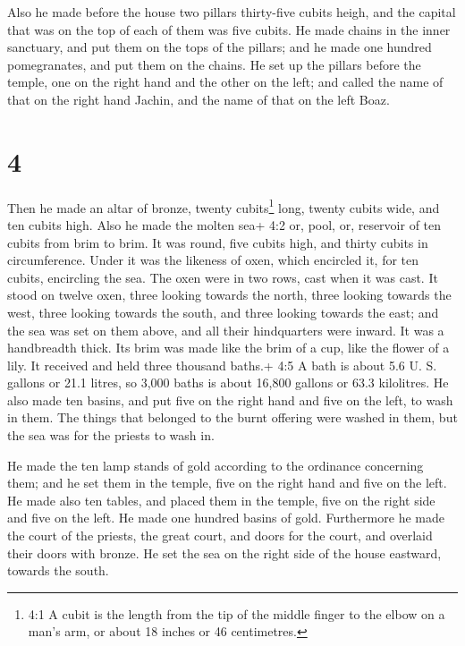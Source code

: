  Also he made before the house two pillars thirty-five
cubits heigh, and the capital that was on the top of each of them was
five cubits.  He made chains in the inner sanctuary, and
put them on the tops of the pillars; and he made one hundred
pomegranates, and put them on the chains.  He set up the
pillars before the temple, one on the right hand and the other on the
left; and called the name of that on the right hand Jachin, and the name
of that on the left Boaz.

\hypertarget{section-3}{%
\section{4}\label{section-3}}

 Then he made an altar of bronze, twenty cubits\footnote{4:1
  A cubit is the length from the tip of the middle finger to the elbow
  on a man's arm, or about 18 inches or 46 centimetres.} long, twenty
cubits wide, and ten cubits high.  Also he made the molten
sea+ 4:2 or, pool, or, reservoir of ten cubits from brim to brim. It was
round, five cubits high, and thirty cubits in circumference.
 Under it was the likeness of oxen, which encircled it, for
ten cubits, encircling the sea. The oxen were in two rows, cast when it
was cast.  It stood on twelve oxen, three looking towards
the north, three looking towards the west, three looking towards the
south, and three looking towards the east; and the sea was set on them
above, and all their hindquarters were inward.  It was a
handbreadth thick. Its brim was made like the brim of a cup, like the
flower of a lily. It received and held three thousand baths.+ 4:5 A bath
is about 5.6 U. S. gallons or 21.1 litres, so 3,000 baths is about
16,800 gallons or 63.3 kilolitres.  He also made ten basins,
and put five on the right hand and five on the left, to wash in them.
The things that belonged to the burnt offering were washed in them, but
the sea was for the priests to wash in.

 He made the ten lamp stands of gold according to the
ordinance concerning them; and he set them in the temple, five on the
right hand and five on the left.  He made also ten tables,
and placed them in the temple, five on the right side and five on the
left. He made one hundred basins of gold.  Furthermore he
made the court of the priests, the great court, and doors for the court,
and overlaid their doors with bronze.  He set the sea on
the right side of the house eastward, towards the south.

